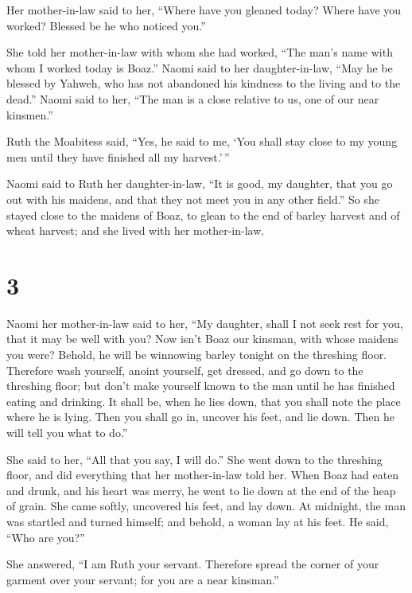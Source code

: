  Her mother-in-law said to her, ``Where have you gleaned
today? Where have you worked? Blessed be he who noticed you.''

She told her mother-in-law with whom she had worked, ``The man's name
with whom I worked today is Boaz.''  Naomi said to her
daughter-in-law, ``May he be blessed by Yahweh, who has not abandoned
his kindness to the living and to the dead.'' Naomi said to her, ``The
man is a close relative to us, one of our near kinsmen.''

 Ruth the Moabitess said, ``Yes, he said to me, `You shall
stay close to my young men until they have finished all my harvest.'\,''

 Naomi said to Ruth her daughter-in-law, ``It is good, my
daughter, that you go out with his maidens, and that they not meet you
in any other field.''  So she stayed close to the maidens
of Boaz, to glean to the end of barley harvest and of wheat harvest; and
she lived with her mother-in-law.

\hypertarget{section-2}{%
\section{3}\label{section-2}}

 Naomi her mother-in-law said to her, ``My daughter, shall I
not seek rest for you, that it may be well with you?  Now
isn't Boaz our kinsman, with whose maidens you were? Behold, he will be
winnowing barley tonight on the threshing floor.  Therefore
wash yourself, anoint yourself, get dressed, and go down to the
threshing floor; but don't make yourself known to the man until he has
finished eating and drinking.  It shall be, when he lies
down, that you shall note the place where he is lying. Then you shall go
in, uncover his feet, and lie down. Then he will tell you what to do.''

 She said to her, ``All that you say, I will do.''
 She went down to the threshing floor, and did everything
that her mother-in-law told her.  When Boaz had eaten and
drunk, and his heart was merry, he went to lie down at the end of the
heap of grain. She came softly, uncovered his feet, and lay down.
 At midnight, the man was startled and turned himself; and
behold, a woman lay at his feet.  He said, ``Who are you?''

She answered, ``I am Ruth your servant. Therefore spread the corner of
your garment over your servant; for you are a near kinsman.''

